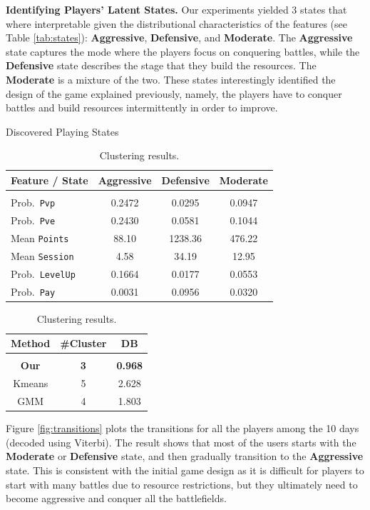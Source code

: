 {\bf Identifying Players' Latent States.} Our experiments yielded 3 states that where interpretable given the distributional characteristics of the features (see 
Table \ref{tab:states}): \textbf{Aggressive}, 
\textbf{Defensive}, and \textbf{Moderate}.  The \textbf{Aggressive} state captures 
the mode where the players focus on conquering battles, while the \textbf{Defensive} 
state describes the stage that they build the resources. The \textbf{Moderate} is a mixture
of the two. These states interestingly identified the design of the game explained previously,
namely, the players have to conquer battles and build resources intermittently in order to improve. 

\begin{table}
\parbox{.65\linewidth}{
\centering
\caption{Discovered Playing States}
\label{tab:states}
\centering
\scalebox{0.8}
{
\begin{tabular}{lccc} 
\bf Feature / State & \textbf{Aggressive}  & \textbf{Defensive}  &  \textbf{Moderate} 
\\ \hline \\
 Prob.\ \texttt{Pvp}     &  0.2472  & 0.0295 &  0.0947  \\
 Prob.\ \texttt{Pve}     &  0.2430  & 0.0581 &  0.1044 \\
 Mean \texttt{Points} &  88.10   & 1238.36 &  476.22 \\
 Mean \texttt{Session}&  4.58    &  34.19  & 12.95 \\
 Prob.\ \texttt{LevelUp} &  0.1664  & 0.0177  & 0.0553 \\
 Prob.\ \texttt{Pay}     &  0.0031  & 0.0956  & 0.0320 \\
\end{tabular}
}
}
\hfill
\parbox{.35\linewidth}{
\centering
\caption{Clustering results.}
\label{tab:clustering}
\begin{tabular}{ccc}
\bf Method & \bf \#Cluster & \bf DB
\\ \hline \\
{\bf Our}     & {\bf 3}  &  {\bf 0.968} \\  
Kmeans  &  5  &  2.628 \\
GMM     &  4  &  1.803 
\end{tabular}
}
\end{table}

Figure \ref{fig:transitions} plots the transitions for all the players among the 10 days (decoded using Viterbi). 
The result shows that most of the users starts with the \textbf{Moderate} or \textbf{Defensive} state, 
and then gradually transition to the \textbf{Aggressive} state. 
This is  consistent with the initial game design as  it is difficult for players  to start with many battles due to  resource restrictions, but they ultimately need to become aggressive and conquer all the battlefields.

